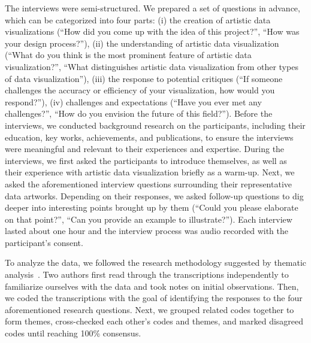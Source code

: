 The interviews were semi-structured. We prepared a set of questions in advance, which can be categorized into four parts: (i) the creation of artistic data visualizations (\eg ``How did you come up with the idea of this project?'', ``How was your design process?''), (ii) the understanding of artistic data visualization (\eg ``What do you think is the most prominent feature of artistic data visualization?'', ``What distinguishes artistic data visualization from other types of data visualization''), (iii) the response to potential critiques (\eg ``If someone challenges the accuracy or efficiency of your visualization, how would you respond?''), (iv) challenges and expectations (\eg ``Have you ever met any challenges?'', ``How do you envision the future of this field?''). 
Before the interviews, we conducted background research on the participants, including their education, key works, achievements, and publications, to ensure the interviews were meaningful and relevant to their experiences and expertise.
During the interviews, we first asked the participants to introduce themselves, as well as their experience with artistic data visualization briefly as a warm-up. Next, we asked the aforementioned interview questions surrounding their representative data artworks. Depending on their responses, we asked follow-up questions to dig deeper into interesting points brought up by them (\eg ``Could you please elaborate on that point?'', ``Can you provide an example to illustrate?''). Each interview lasted about one hour and the interview process was audio recorded with the participant's consent.


To analyze the data, we followed the research methodology suggested by thematic analysis~\cite{braun2022thematic}.
Two authors first read through the transcriptions independently to familiarize ourselves with the data and took notes on initial observations.
Then, we coded the transcriptions with the goal of identifying the responses to the four aforementioned research questions. 
Next, we grouped related codes together to form themes, cross-checked each other's codes and themes, and marked disagreed codes until reaching 100\% consensus. 


